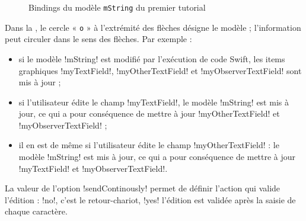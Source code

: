 \newcommand\FondModele{LightGray!25}

\newcommand\Modele[4]{
  \SetVertexNormal[Shape=rectangle, LineColor=black, FillColor=\FondModele, LineWidth=1pt]
  \Vertex[x=#3, y=#4, L={\tt #2}]{#1}
}

\newcommand\ItemGraphique[4]{
  \SetVertexNormal[Shape=rectangle, LineColor=blue, FillColor=\FondModele, LineWidth=1pt]
  \Vertex[x=#3, y=#4, L={\tt #2}]{#1}
}

\newcommand\Fleche[4]{
  \draw [#1, thick, black] (#2) edge[#4] (#3) ;
}

\begin{figure}[t]
  \centering
  \small
  \caption{Bindings du modèle \texttt{mString} du premier tutorial}
  \ligne
\end{figure}

Dans la , le cercle « \texttt{o} » à l'extrémité des flèches désigne le modèle ; l'information peut circuler dans le sens des flèches. Par exemple :
\begin{itemize}
  \item si le modèle \eb!mString! est modifié par l'exécution de code Swift, les items graphiques \eb!myTextField!, \eb!myOtherTextField! et \eb!myObserverTextField! sont mis à jour ;
  \item si l'utilisateur édite le champ \eb!myTextField!, le modèle \eb!mString! est mis à jour, ce qui a pour conséquence de mettre à jour \eb!myOtherTextField! et \eb!myObserverTextField! ;
  \item il en est de même si l'utilisateur édite le champ \eb!myOtherTextField! : le modèle \eb!mString! est mis à jour, ce qui a pour conséquence de mettre à jour \eb!myTextField! et \eb!myObserverTextField!.
\end{itemize}

La valeur de l'option \eb!sendContinously! permet de définir l'action qui valide l'édition : \eb!no!, c'est le retour-chariot, \eb!yes! l'édition est validée après la saisie de chaque caractère.





